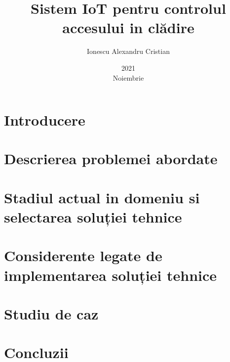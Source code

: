 \documentclass[12pt,romanian]{report}
\title{Sistem IoT pentru controlul\\accesului in clădire}
\date{2021\\ Noiembrie}
\author{Ionescu Alexandru Cristian}
\begin{document}
\maketitle


\tableofcontents

\chapter{Introducere}


\chapter{Descrierea problemei abordate}


\chapter{Stadiul actual in domeniu si selectarea soluției tehnice}


\chapter{Considerente legate de implementarea soluției tehnice}


\chapter{Studiu de caz}


\chapter{Concluzii}


% 


\printbibliography
\end{document}

